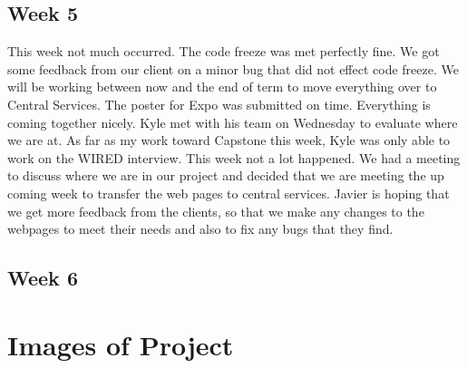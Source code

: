 \documentclass[letterpaper,10pt,serif,draftclsnofoot,onecolumn,compsoc,titlepage]{IEEEtran}
\begin{document}
\subsection{Week 5}
This week not much occurred. The code freeze was met perfectly fine. We got some feedback from our
 client on a minor bug that did not effect code freeze. We will be working between now and the end
 of term to move everything over to Central Services. The poster for Expo was submitted on time.
 Everything is coming together nicely.
 Kyle met with his team on Wednesday to evaluate where we are at. As far as my work toward Capstone 
 this week, Kyle was only able to work on the WIRED interview.
 This week not a lot happened. We had a meeting to discuss where we are in our project and decided
 that we are meeting the up coming week to transfer the web pages to central services. Javier is
 hoping that we get more feedback from the clients, so that we make any changes to the webpages to
 meet their needs and also to fix any bugs that they find.
\subsection{Week 6}
\newpage
\section{Images of Project}

%
%
\end{document}

